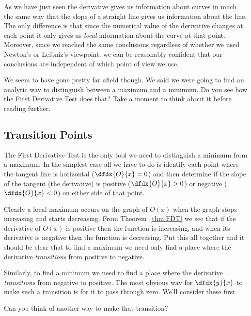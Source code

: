 As we have just seen the derivative gives us information about curves
in much the same way that the slope of a straight line gives us
information about the line. The only difference is that since the
numerical value of the derivative changes at each point it only gives
us \emph{local} information about the curve at that point. 
Moreover, since we reached the same conclusions regardless of whether
we used Newton's or Leibniz's viewpoint, we can be reasonably
confident that our conclusions are independent of which point of view we
use.

We seem to have gone pretty far afield though. We said we were going
to find an analytic way to distinguish between a maximum and a
minimum. Do you see how the First Derivative Test does that? Take a
moment to think about it before reading further.

\subsection{Transition Points}
The First Derivative Test is the only tool we need to distinguish a
minimum from a maximum. In the simplest case all we have to do is
identify each point where the tangent line is horizontal
($\dfdx{O}{x}=0$) and then determine if the slope of the tangent (the
derivative) is positive
($\dfdx{O}{x}>0$) or negative ($\dfdx{O}{x}<0$) on either side of that
point.



Clearly a local maximum occurs on the graph of $O(x)$ when the graph stops
increasing and starts decreasing. From Theorem~\ref{thm:FDT} we see
that if the derivative of $O(x)$ is positive then the function is
increasing, and when its derivative is negative then the function is
decreasing. Put this all together and it should be clear that to find
a maximum we need only find a place where the derivative \emph{transitions} from
positive to negative.

Similarly, to find a minimum we need to find a place where
the derivative \emph{transitions} from negative to positive. The most
obvious way for $\dfdx{y}{x}$ to make such a transition is for it to
pass through zero. We'll consider these first.

\begin{ProficiencyDrill}
  Can you think of another way to make that transition?
\end{ProficiencyDrill}

